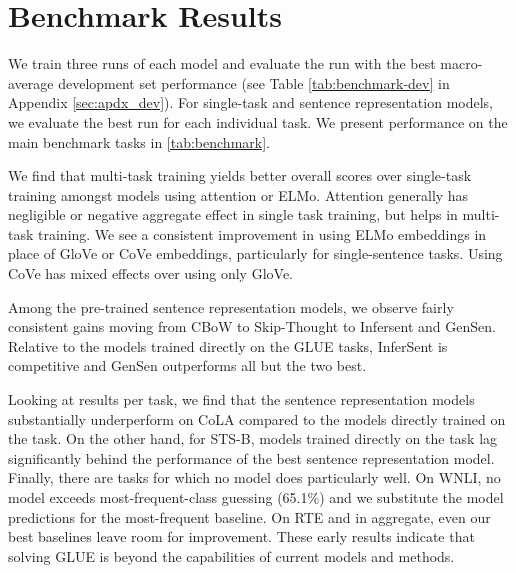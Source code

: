 \documentclass{article} \usepackage{iclr2019_conference,times}
\begin{document}
\begin{table*}[t]
\begin{tabular}{lrrrrrrrrrr}
\bottomrule
\end{tabular}
\caption{Baseline performance on the GLUE task test sets. 
For MNLI, we report accuracy on the matched and mismatched test sets. For MRPC and Quora, we report accuracy and F1. For STS-B, we report Pearson and Spearman correlation. For CoLA, we report Matthews correlation. For all other tasks we report accuracy. All values are scaled by 100.
A similar table is presented on the online platform. }
\label{tab:benchmark}
\end{table*}

\section{Benchmark Results}\label{sec:experiments}

We train three runs of each model and evaluate the run with the best macro-average development set performance (see Table \ref{tab:benchmark-dev} in Appendix \ref{sec:apdx_dev}). For single-task and sentence representation models, we evaluate the best run for each individual task. We present performance on the main benchmark tasks in \autoref{tab:benchmark}. 

We find that multi-task training yields better overall scores over single-task training amongst models using attention or ELMo.
Attention generally has negligible or negative aggregate effect in single task training, but helps in multi-task training.
We see a consistent improvement in using ELMo embeddings in place of GloVe or CoVe embeddings, particularly for single-sentence tasks.
Using CoVe has mixed effects over using only GloVe.

Among the pre-trained sentence representation models, we observe fairly consistent gains moving from CBoW to Skip-Thought to Infersent and GenSen.
Relative to the models trained directly on the GLUE tasks, InferSent is competitive and GenSen outperforms all but the two best.

Looking at results per task, we find that the sentence representation models substantially underperform on CoLA compared to the models directly trained on the task. 
On the other hand, for STS-B, models trained directly on the task lag significantly behind the performance of the best sentence representation model.
Finally, there are tasks for which no model does particularly well. On WNLI, no model exceeds most-frequent-class guessing (65.1\%) and we substitute the model predictions for the most-frequent baseline. On RTE and in aggregate, even our best baselines leave room for improvement.
These early results indicate that solving GLUE is beyond the capabilities of current models and methods.
\end{document}
